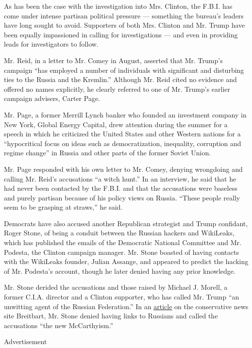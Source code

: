 As has been the case with the investigation into Mrs. Clinton, the
F.B.I. has come under intense partisan political pressure --- something
the bureau's leaders have long sought to avoid. Supporters of both Mrs.
Clinton and Mr. Trump have been equally impassioned in calling for
investigations --- and even in providing leads for investigators to
follow.

Mr. Reid, in a letter to Mr. Comey in August, asserted that Mr. Trump's
campaign ``has employed a number of individuals with significant and
disturbing ties to the Russia and the Kremlin.'' Although Mr. Reid cited
no evidence and offered no names explicitly, he clearly referred to one
of Mr. Trump's earlier campaign advisers, Carter Page.

Mr. Page, a former Merrill Lynch banker who founded an investment
company in New York, Global Energy Capital, drew attention during the
summer for a speech in which he criticized the United States and other
Western nations for a ``hypocritical focus on ideas such as
democratization, inequality, corruption and regime change'' in Russia
and other parts of the former Soviet Union.

Mr. Page responded with his own letter to Mr. Comey, denying wrongdoing
and calling Mr. Reid's accusations ``a witch hunt.'' In an interview, he
said that he had never been contacted by the F.B.I. and that the
accusations were baseless and purely partisan because of his policy
views on Russia. ``These people really seem to be grasping at straws,''
he said.

Democrats have also accused another Republican strategist and Trump
confidant, Roger Stone, of being a conduit between the Russian hackers
and WikiLeaks, which has published the emails of the Democratic National
Committee and Mr. Podesta, the Clinton campaign manager. Mr. Stone
boasted of having contacts with the WikiLeaks founder, Julian Assange,
and appeared to predict the hacking of Mr. Podesta's account, though he
later denied having any prior knowledge.

Mr. Stone derided the accusations and those raised by Michael J. Morell,
a former C.I.A. director and a Clinton supporter, who has called Mr.
Trump ``an unwitting agent of the Russian Federation.'' In an
\href{http://www.breitbart.com/hillary-clinton/2016/10/19/stone-wikileaks-mike-morell-russia/}{article}
on the conservative news site Breitbart, Mr. Stone denied having links
to Russians and called the accusations ``the new McCarthyism.''

Advertisement

